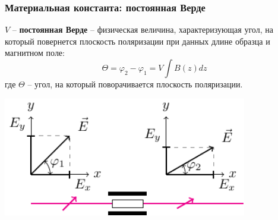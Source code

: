 \documentclass[10pt,pdf,hyperref={unicode}, dvipsnames]{beamer}
\begin{document}
\begin{frame}
	\frametitle{Материальная константа: постоянная Верде}
	$V$ -- \textbf{постоянная Верде} -- физическая величина, характеризующая угол, на который повернется плоскость поляризации при данных длине образца и магнитном поле:
	\begin{equation}
		\Theta=\varphi_2-\varphi_1=V \int B(z)dz
	\end{equation}
	где $\Theta$ -- угол, на который поворачивается плоскость поляризации.
	\begin{center}
		\includegraphics[width=0.8\textwidth]{images/rotpol}
	\end{center}
\end{frame}

\end{document}
